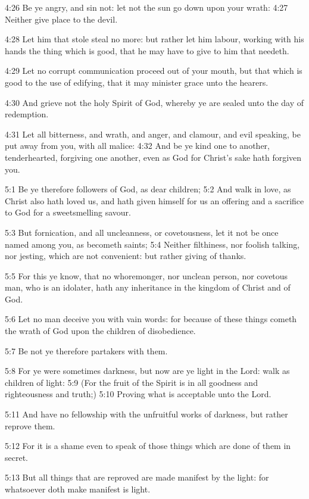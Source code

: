 4:26 Be ye angry, and sin not: let not the sun go down upon your
wrath: 4:27 Neither give place to the devil.

4:28 Let him that stole steal no more: but rather let him labour,
working with his hands the thing which is good, that he may have to
give to him that needeth.

4:29 Let no corrupt communication proceed out of your mouth, but that
which is good to the use of edifying, that it may minister grace unto
the hearers.

4:30 And grieve not the holy Spirit of God, whereby ye are sealed unto
the day of redemption.

4:31 Let all bitterness, and wrath, and anger, and clamour, and evil
speaking, be put away from you, with all malice: 4:32 And be ye kind
one to another, tenderhearted, forgiving one another, even as God for
Christ's sake hath forgiven you.

5:1 Be ye therefore followers of God, as dear children; 5:2 And walk
in love, as Christ also hath loved us, and hath given himself for us
an offering and a sacrifice to God for a sweetsmelling savour.

5:3 But fornication, and all uncleanness, or covetousness, let it not
be once named among you, as becometh saints; 5:4 Neither filthiness,
nor foolish talking, nor jesting, which are not convenient: but rather
giving of thanks.

5:5 For this ye know, that no whoremonger, nor unclean person, nor
covetous man, who is an idolater, hath any inheritance in the kingdom
of Christ and of God.

5:6 Let no man deceive you with vain words: for because of these
things cometh the wrath of God upon the children of disobedience.

5:7 Be not ye therefore partakers with them.

5:8 For ye were sometimes darkness, but now are ye light in the Lord:
walk as children of light: 5:9 (For the fruit of the Spirit is in all
goodness and righteousness and truth;) 5:10 Proving what is acceptable
unto the Lord.

5:11 And have no fellowship with the unfruitful works of darkness, but
rather reprove them.

5:12 For it is a shame even to speak of those things which are done of
them in secret.

5:13 But all things that are reproved are made manifest by the light:
for whatsoever doth make manifest is light.

